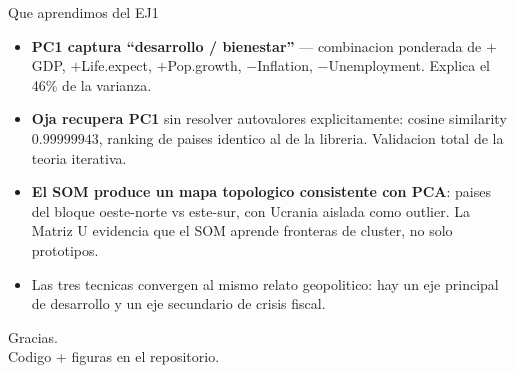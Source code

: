 \documentclass[aspectratio=169, 10pt]{beamer}
\begin{document}
\begin{frame}{Que aprendimos del EJ1}
  \begin{itemize}
    \item \textbf{PC1 captura ``desarrollo / bienestar''} --- combinacion ponderada de $+$GDP, $+$Life.expect, $+$Pop.growth, $-$Inflation, $-$Unemployment. Explica el 46\% de la varianza.
    \item \textbf{Oja recupera PC1} sin resolver autovalores explicitamente: cosine similarity $0.99999943$, ranking de paises identico al de la libreria. Validacion total de la teoria iterativa.
    \item \textbf{El SOM produce un mapa topologico consistente con PCA}: paises del bloque oeste-norte vs este-sur, con Ucrania aislada como outlier. La Matriz U evidencia que el SOM aprende fronteras de cluster, no solo prototipos.
    \item Las tres tecnicas convergen al \alert{mismo relato geopolitico}: hay un eje principal de desarrollo y un eje secundario de crisis fiscal.
  \end{itemize}
\end{frame}

\begin{frame}[standout]
  Gracias.\\[0.6em]
  \small Codigo + figuras en el repositorio.
\end{frame}
\end{document}
